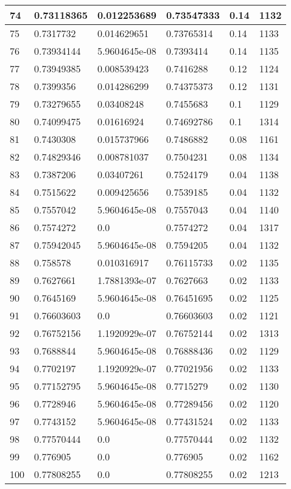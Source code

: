 \begin{longtable}{|l|l|l|l|l|l|}
74 & 0.73118365 & 0.012253689 & 0.73547333 & 0.14 & 1132 \\ \hline 
75 & 0.7317732 & 0.014629651 & 0.73765314 & 0.14 & 1133 \\ \hline 
76 & 0.73934144 & 5.9604645e-08 & 0.7393414 & 0.14 & 1135 \\ \hline 
77 & 0.73949385 & 0.008539423 & 0.7416288 & 0.12 & 1124 \\ \hline 
78 & 0.7399356 & 0.014286299 & 0.74375373 & 0.12 & 1131 \\ \hline 
79 & 0.73279655 & 0.03408248 & 0.7455683 & 0.1 & 1129 \\ \hline 
80 & 0.74099475 & 0.01616924 & 0.74692786 & 0.1 & 1314 \\ \hline 
81 & 0.7430308 & 0.015737966 & 0.7486882 & 0.08 & 1161 \\ \hline 
82 & 0.74829346 & 0.008781037 & 0.7504231 & 0.08 & 1134 \\ \hline 
83 & 0.7387206 & 0.03407261 & 0.7524179 & 0.04 & 1138 \\ \hline 
84 & 0.7515622 & 0.009425656 & 0.7539185 & 0.04 & 1132 \\ \hline 
85 & 0.7557042 & 5.9604645e-08 & 0.7557043 & 0.04 & 1140 \\ \hline 
86 & 0.7574272 & 0.0 & 0.7574272 & 0.04 & 1317 \\ \hline 
87 & 0.75942045 & 5.9604645e-08 & 0.7594205 & 0.04 & 1132 \\ \hline 
88 & 0.758578 & 0.010316917 & 0.76115733 & 0.02 & 1135 \\ \hline 
89 & 0.7627661 & 1.7881393e-07 & 0.7627663 & 0.02 & 1133 \\ \hline 
90 & 0.7645169 & 5.9604645e-08 & 0.76451695 & 0.02 & 1125 \\ \hline 
91 & 0.76603603 & 0.0 & 0.76603603 & 0.02 & 1121 \\ \hline 
92 & 0.76752156 & 1.1920929e-07 & 0.76752144 & 0.02 & 1313 \\ \hline 
93 & 0.7688844 & 5.9604645e-08 & 0.76888436 & 0.02 & 1129 \\ \hline 
94 & 0.7702197 & 1.1920929e-07 & 0.77021956 & 0.02 & 1133 \\ \hline 
95 & 0.77152795 & 5.9604645e-08 & 0.7715279 & 0.02 & 1130 \\ \hline 
96 & 0.7728946 & 5.9604645e-08 & 0.77289456 & 0.02 & 1120 \\ \hline 
97 & 0.7743152 & 5.9604645e-08 & 0.77431524 & 0.02 & 1133 \\ \hline 
98 & 0.77570444 & 0.0 & 0.77570444 & 0.02 & 1132 \\ \hline 
99 & 0.776905 & 0.0 & 0.776905 & 0.02 & 1162 \\ \hline 
100 & 0.77808255 & 0.0 & 0.77808255 & 0.02 & 1213 \\ \hline 
\end{longtable}